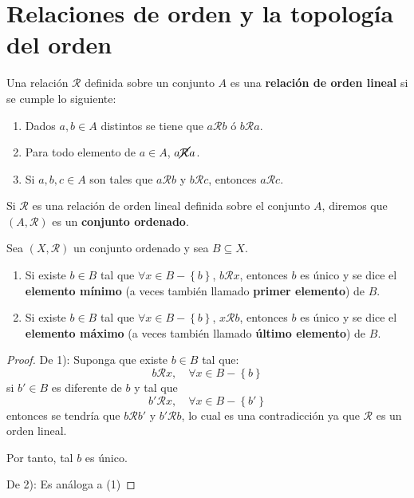 \documentclass[12pt]{report}
\theoremstyle{largebreak}
\begin{document}
    \section{Relaciones de orden y la topología del orden}

    \begin{mydef}
        Una relación $\mathcal{R}$ definida sobre un conjunto $A$ es una \textbf{relación de orden lineal} si se cumple lo siguiente:
        \begin{enumerate}
            \item Dados $a,b\in A$ distintos se tiene que $a\mathcal{R}b$ ó $b\mathcal{R}a$.
            \item Para todo elemento de $a\in A$, $a\cancel{\mathcal{R}}a$.
            \item Si $a,b,c\in A$ son tales que $a\mathcal{R}b$ y $b\mathcal{R}c$, entonces $a\mathcal{R}c$.
        \end{enumerate}
    \end{mydef}

    \begin{mydef}
        Si $\mathcal{R}$ es una relación de orden lineal definida sobre el conjunto $A$, diremos que $(A,\mathcal{R})$ es un \textbf{conjunto ordenado}.
    \end{mydef}

    \begin{propo}
        Sea $(X,\mathcal{R})$ un conjunto ordenado y sea $B\subseteq X$.
        \begin{enumerate}
            \item Si existe $b\in B$ tal que $\forall x\in B-\left\{b\right\}$, $b\mathcal{R} x$, entonces $b$ es único y se dice el \textbf{elemento mínimo} (a veces también llamado \textbf{primer elemento}) de $B$.
            \item Si existe $b\in B$ tal que $\forall x\in B-\left\{b\right\}$, $x\mathcal{R} b$, entonces $b$ es único y se dice el \textbf{elemento máximo} (a veces también llamado \textbf{último elemento}) de $B$.
        \end{enumerate}
    \end{propo}

    \begin{proof}
        De 1): Suponga que existe $b\in B$ tal que:
        \begin{equation*}
            b\mathcal{R}x,\quad\forall x\in B-\left\{b\right\}
        \end{equation*}
        si $b'\in B$ es diferente de $b$ y tal que
        \begin{equation*}
            b'\mathcal{R}x,\quad\forall x\in B-\left\{b'\right\}
        \end{equation*}
        entonces se tendría que $b\mathcal{R}b'$ y $b'\mathcal{R}b$, lo cual es una contradicción ya que $\mathcal{R}$ es un orden lineal.

        Por tanto, tal $b$ es único.

        De 2): Es análoga a (1)

    \end{proof}
\end{document}
